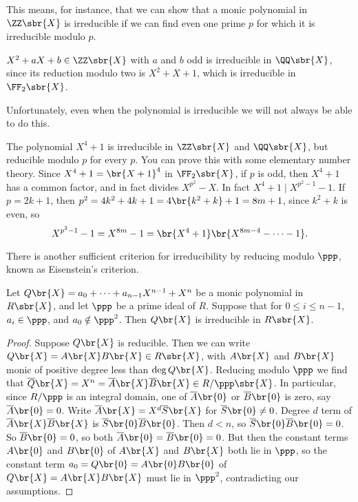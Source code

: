 This means, for instance, that we can show that a monic polynomial in $ \ZZ\sbr{X} $ is irreducible if we can find even one prime $ p $ for which it is irreducible modulo $ p $.

\begin{example*}
$ X^2 + aX + b \in \ZZ\sbr{X} $ with $ a $ and $ b $ odd is irreducible in $ \QQ\sbr{X} $, since its reduction modulo two is $ X^2 + X + 1 $, which is irreducible in $ \FF_2\sbr{X} $.
\end{example*}

\pagebreak

Unfortunately, even when the polynomial is irreducible we will not always be able to do this.

\begin{example*}
The polynomial $ X^4 + 1 $ is irreducible in $ \ZZ\sbr{X} $ and $ \QQ\sbr{X} $, but reducible modulo $ p $ for every $ p $. You can prove this with some elementary number theory. Since $ X^4 + 1 = \br{X + 1}^4 $ in $ \FF_2\sbr{X} $, if $ p $ is odd, then $ X^4 + 1 $ has a common factor, and in fact divides $ X^{p^2} - X $. In fact $ X^4 + 1 \mid X^{p^2 - 1} - 1 $. If $ p = 2k + 1 $, then $ p^2 = 4k^2 + 4k + 1 = 4\br{k^2 + k} + 1 = 8m + 1 $, since $ k^2 + k $ is even, so
$$ X^{p^2 - 1} - 1 = X^{8m} - 1 = \br{X^4 + 1}\br{X^{8m - 4} - \dots - 1}. $$
\end{example*}

There is another sufficient criterion for irreducibility by reducing modulo $ \ppp $, known as Eisenstein's criterion.

\begin{proposition}
Let $ Q\br{X} = a_0 + \dots + a_{n - 1}X^{n - 1} + X^n $ be a monic polynomial in $ R\sbr{X} $, and let $ \ppp $ be a prime ideal of $ R $. Suppose that for $ 0 \le i \le n - 1 $, $ a_i \in \ppp $, and $ a_0 \notin \ppp^2 $. Then $ Q\br{X} $ is irreducible in $ R\sbr{X} $.
\end{proposition}

\begin{proof}
Suppose $ Q\br{X} $ is reducible. Then we can write $ Q\br{X} = A\br{X}B\br{X} \in R\sbr{X} $, with $ A\br{X} $ and $ B\br{X} $ monic of positive degree less than $ \deg Q\br{X} $. Reducing modulo $ \ppp $ we find that $ \overline{Q}\br{X} = X^n = \overline{A}\br{X}\overline{B}\br{X} \in R / \ppp\sbr{X} $. In particular, since $ R / \ppp $ is an integral domain, one of $ \overline{A}\br{0} $ or $ \overline{B}\br{0} $ is zero, say $ \overline{A}\br{0} = 0 $. Write $ \overline{A}\br{X} = X^d\overline{S}\br{X} $ for $ \overline{S}\br{0} \ne 0 $. Degree $ d $ term of $ \overline{A}\br{X}\overline{B}\br{X} $ is $ \overline{S}\br{0}\overline{B}\br{0} $. Then $ d < n $, so $ \overline{S}\br{0}\overline{B}\br{0} = 0 $. So $ \overline{B}\br{0} = 0 $, so both $ \overline{A}\br{0} = \overline{B}\br{0} = 0 $. But then the constant terms $ A\br{0} $ and $ B\br{0} $ of $ A\br{X} $ and $ B\br{X} $ both lie in $ \ppp $, so the constant term $ a_0 = Q\br{0} = A\br{0}B\br{0} $ of $ Q\br{X} = A\br{X}B\br{X} $ must lie in $ \ppp^2 $, contradicting our assumptions.
\end{proof}

